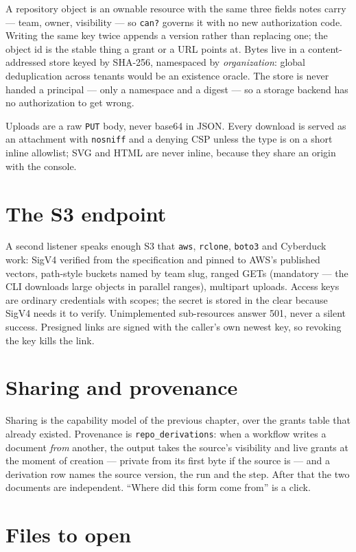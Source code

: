 \documentclass[11pt,a4paper]{report}
\begin{document}
A repository object is an ownable resource with the same three fields notes carry --- team, owner, visibility --- so \texttt{can?} governs it with no new authorization code. Writing the same key twice appends a version rather than replacing one; the object id is the stable thing a grant or a URL points at. Bytes live in a content-addressed store keyed by SHA-256, namespaced by \emph{organization}: global deduplication across tenants would be an existence oracle. The store is never handed a principal --- only a namespace and a digest --- so a storage backend has no authorization to get wrong.

Uploads are a raw \texttt{PUT} body, never base64 in JSON. Every download is served as an attachment with \texttt{nosniff} and a denying CSP unless the type is on a short inline allowlist; SVG and HTML are never inline, because they share an origin with the console.

\section{The S3 endpoint}

A second listener speaks enough S3 that \texttt{aws}, \texttt{rclone}, \texttt{boto3} and Cyberduck work: SigV4 verified from the specification and pinned to AWS's published vectors, path-style buckets named by team slug, ranged GETs (mandatory --- the CLI downloads large objects in parallel ranges), multipart uploads. Access keys are ordinary credentials with scopes; the secret is stored in the clear because SigV4 needs it to verify. Unimplemented sub-resources answer 501, never a silent success. Presigned links are signed with the caller's own newest key, so revoking the key kills the link.

\section{Sharing and provenance}

Sharing is the capability model of the previous chapter, over the grants table that already existed. Provenance is \texttt{repo\_derivations}: when a workflow writes a document \emph{from} another, the output takes the source's visibility and live grants at the moment of creation --- private from its first byte if the source is --- and a derivation row names the source version, the run and the step. After that the two documents are independent. ``Where did this form come from'' is a click.

\section{Files to open}
\end{document}
